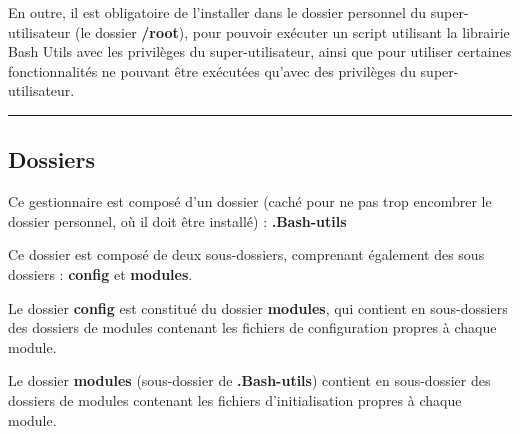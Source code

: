 \documentclass[a4paper,10pt]{article}
\begin{document}
\begin{justify}
    En outre, il est obligatoire de l'installer dans le dossier personnel du super-utilisateur (le dossier \textbf{\color{lime}/root\color{white}}), pour pouvoir exécuter un script utilisant la librairie Bash Utils avec les privilèges du super-utilisateur, ainsi que pour utiliser certaines fonctionnalités ne pouvant être exécutées qu'avec des privilèges du super-utilisateur.
\end{justify}




\color{green}\par\noindent\rule{\textwidth}{0.4pt}\color{white}

\color{green}
\subsection{Dossiers}\color{white}

\begin{justify}
    Ce gestionnaire est composé d'un dossier (caché pour ne pas trop encombrer le dossier personnel, où il doit être installé) : \textbf{\color{lime}.Bash-utils\color{white}}
\end{justify}

\begin{justify}
    Ce dossier est composé de deux sous-dossiers, comprenant également des sous dossiers : \textbf{\color{lime}config\color{white}} et \textbf{\color{lime}modules\color{white}}.
\end{justify}

\begin{justify}
    Le dossier \textbf{\color{lime}config\color{white}} est constitué du dossier \textbf{\color{lime}modules\color{white}}, qui contient en sous-dossiers des dossiers de modules contenant les fichiers de configuration propres à chaque module.
\end{justify}

\begin{justify}
    Le dossier \textbf{\color{lime}modules\color{white}} (sous-dossier de \textbf{\color{lime}.Bash-utils\color{white}}) contient en sous-dossier des dossiers de modules contenant les fichiers d'initialisation propres à chaque module.
\end{justify}



\end{document}
